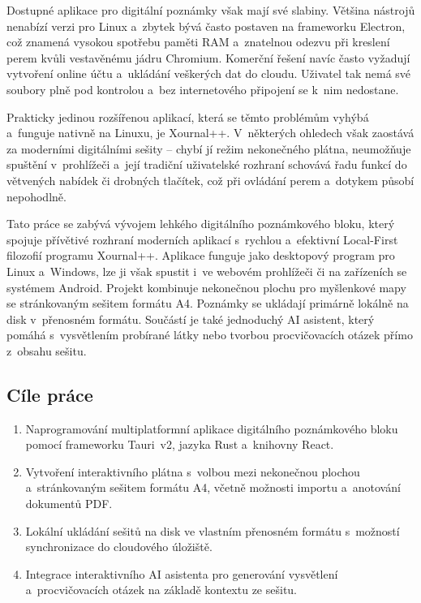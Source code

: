 \documentclass[12pt, a4paper, oneside]{article}
\begin{document}
Dostupné aplikace pro digitální poznámky však mají své slabiny. Většina nástrojů nenabízí verzi pro Linux a~zbytek bývá často postaven na frameworku Electron, což znamená vysokou spotřebu paměti RAM a~znatelnou odezvu při kreslení perem kvůli vestavěnému jádru Chromium. Komerční řešení navíc často vyžadují vytvoření online účtu a~ukládání veškerých dat do cloudu. Uživatel tak nemá své soubory plně pod kontrolou a~bez internetového připojení se k~nim nedostane.

Prakticky jedinou rozšířenou aplikací, která se těmto problémům vyhýbá a~funguje nativně na Linuxu, je Xournal++. V~některých ohledech však zaostává za moderními digitálními sešity – chybí jí režim nekonečného plátna, neumožňuje spuštění v~prohlížeči a~její tradiční uživatelské rozhraní schovává řadu funkcí do větvených nabídek či drobných tlačítek, což při ovládání perem a~dotykem působí nepohodlně.

Tato práce se zabývá vývojem lehkého digitálního poznámkového bloku, který spojuje přívětivé rozhraní moderních aplikací s~rychlou a~efektivní Local-First filozofií programu Xournal++. Aplikace funguje jako desktopový program pro Linux a~Windows, lze ji však spustit i~ve webovém prohlížeči či na zařízeních se systémem Android. Projekt kombinuje nekonečnou plochu pro myšlenkové mapy se stránkovaným sešitem formátu A4. Poznámky se ukládají primárně lokálně na disk v~přenosném formátu. Součástí je také jednoduchý AI asistent, který pomáhá s~vysvětlením probírané látky nebo tvorbou procvičovacích otázek přímo z~obsahu sešitu.

\subsection{Cíle práce}
\label{sec:cile_prace}

\begin{enumerate}
    \item Naprogramování multiplatformní aplikace digitálního poznámkového bloku pomocí frameworku Tauri~v2, jazyka Rust a~knihovny React.
    \item Vytvoření interaktivního plátna s~volbou mezi nekonečnou plochou a~stránkovaným sešitem formátu A4, včetně možnosti importu a~anotování dokumentů PDF.
    \item Lokální ukládání sešitů na disk ve vlastním přenosném formátu s~možností synchronizace do cloudového úložiště.
    \item Integrace interaktivního AI asistenta pro generování vysvětlení a~procvičovacích otázek na základě kontextu ze sešitu.
\end{enumerate}
\end{document}
